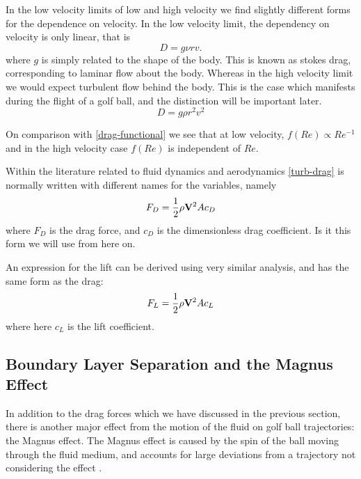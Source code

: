 In the low velocity limits of low and high velocity we find slightly different forms for the dependence 
on velocity. In the low velocity limit, the dependency on velocity is only linear, that is
\begin{equation}
D = g \nu r v .
\end{equation}
where $g$ is simply related to the shape of the body. This is known as stokes drag, corresponding to
laminar flow about the body.
Whereas in the high velocity limit we would expect turbulent flow behind the body. This is the case
which manifests during the flight of a golf ball, and the distinction will be important later.
\begin{equation} \label{turb-drag}
D = g \rho r^2 v^2
\end{equation}

On comparison with \eqref{drag-functional} we see that at low velocity, $f(Re) \propto Re^{-1}$
and in the high velocity case $f(Re)$ is independent of $Re$.

Within the literature related to fluid dynamics and aerodynamics \eqref{turb-drag} is normally written
with different names for the variables, namely 
\begin{equation} \label{drag}
F_{D} = \frac{1}{2} \rho \mathbf{V}^2 A c_{D}
\end{equation}
where $F_{D}$ is the drag force, and $c_{D}$ is the dimensionless drag coefficient. Is it this form
we will use from here on. 

An expression for the lift can be derived using very similar analysis, and has the same form as the
drag:
\begin{equation} \label{lift}
F_{L} = \frac{1}{2} \rho \mathbf{V}^2 A c_{L}
\end{equation}
where here $c_{L}$ is the lift coefficient.
\subsection{Boundary Layer Separation and the Magnus Effect}

In addition to the drag forces which we have discussed in the previous section, there is another
major effect from the motion of the fluid on golf ball trajectories: the Magnus effect. The Magnus
effect is caused by the spin of the ball moving through the fluid medium, and accounts for large
deviations from a trajectory not considering the effect \citet{Seifert2012}.

